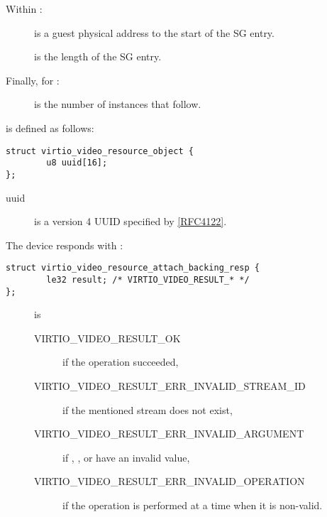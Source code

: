 Within :

\begin{description}
\item[]
is a guest physical address to the start of the SG entry.
\item[]
is the length of the SG entry.
\end{description}

Finally, for :

\begin{description}
\item[]
is the number of  instances
that follow.
\end{description}

 is defined as follows:

\begin{lstlisting}
struct virtio_video_resource_object {
        u8 uuid[16];
};
\end{lstlisting}

\begin{description}
\item[uuid]
is a version 4 UUID specified by \hyperref[intro:rfc4122]{[RFC4122]}.
\end{description}

The device responds with
:

\begin{lstlisting}
struct virtio_video_resource_attach_backing_resp {
        le32 result; /* VIRTIO_VIDEO_RESULT_* */
};
\end{lstlisting}

\begin{description}
\item[]
is

\begin{description}
\item[VIRTIO_VIDEO_RESULT_OK]
if the operation succeeded,
\item[VIRTIO_VIDEO_RESULT_ERR_INVALID_STREAM_ID]
if the mentioned stream does not exist,
\item[VIRTIO_VIDEO_RESULT_ERR_INVALID_ARGUMENT]
if , , or  have an
invalid value,
\item[VIRTIO_VIDEO_RESULT_ERR_INVALID_OPERATION]
if the operation is performed at a time when it is non-valid.
\end{description}
\end{description}

